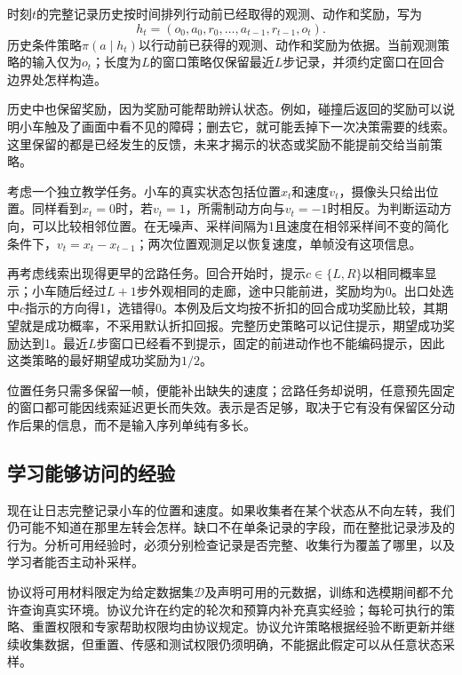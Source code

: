 \begin{definition}[决策历史]
  \label{def:rl-information-history}
  时刻$t$的完整记录历史按时间排列行动前已经取得的观测、动作和奖励，写为
  \[
    h_t=(o_0,a_0,r_0,\ldots,a_{t-1},r_{t-1},o_t).
  \]
  历史条件策略$\pi(a\mid h_t)$以行动前已获得的观测、动作和奖励为依据。当前观测策略的输入仅为$o_t$；长度为$L$的窗口策略仅保留最近$L$步记录，并须约定窗口在回合边界处怎样构造。
\end{definition}

历史中也保留奖励，因为奖励可能帮助辨认状态。例如，碰撞后返回的奖励可以说明小车触及了画面中看不见的障碍；删去它，就可能丢掉下一次决策需要的线索。这里保留的都是已经发生的反馈，未来才揭示的状态或奖励不能提前交给当前策略。

\begin{example}[相同位置与不同记忆]
  \label{ex:rl-information-cue}
  考虑一个独立教学任务。小车的真实状态包括位置$x_t$和速度$v_t$，摄像头只给出位置。同样看到$x_t=0$时，若$v_t=1$，所需制动方向与$v_t=-1$时相反。为判断运动方向，可以比较相邻位置。在无噪声、采样间隔为1且速度在相邻采样间不变的简化条件下，$v_t=x_t-x_{t-1}$；两次位置观测足以恢复速度，单帧没有这项信息。

  再考虑线索出现得更早的岔路任务。回合开始时，提示$c\in\{L,R\}$以相同概率显示；小车随后经过$L+1$步外观相同的走廊，途中只能前进，奖励均为0。出口处选中$c$指示的方向得1，选错得0。本例及后文均按不折扣的回合成功奖励比较，其期望就是成功概率，不采用默认折扣回报。完整历史策略可以记住提示，期望成功奖励达到1。最近$L$步窗口已经看不到提示，固定的前进动作也不能编码提示，因此这类策略的最好期望成功奖励为$1/2$。
\end{example}

位置任务只需多保留一帧，便能补出缺失的速度；岔路任务却说明，任意预先固定的窗口都可能因线索延迟更长而失效。表示是否足够，取决于它有没有保留区分动作后果的信息，而不是输入序列单纯有多长。

\subsection{学习能够访问的经验}
\label{sec:rl-information-data-access}

现在让日志完整记录小车的位置和速度。如果收集者在某个状态从不向左转，我们仍可能不知道在那里左转会怎样。缺口不在单条记录的字段，而在整批记录涉及的行为。分析可用经验时，必须分别检查记录是否完整、收集行为覆盖了哪里，以及学习者能否主动补采样。

\begin{definition}[经验访问协议]
  \label{def:rl-information-access}
  协议将可用材料限定为给定数据集$\mathcal D$及声明可用的元数据，训练和选模期间都不允许查询真实环境。协议允许在约定的轮次和预算内补充真实经验；每轮可执行的策略、重置权限和专家帮助权限均由协议规定。协议允许策略根据经验不断更新并继续收集数据，但重置、传感和测试权限仍须明确，不能据此假定可以从任意状态采样。
\end{definition}

